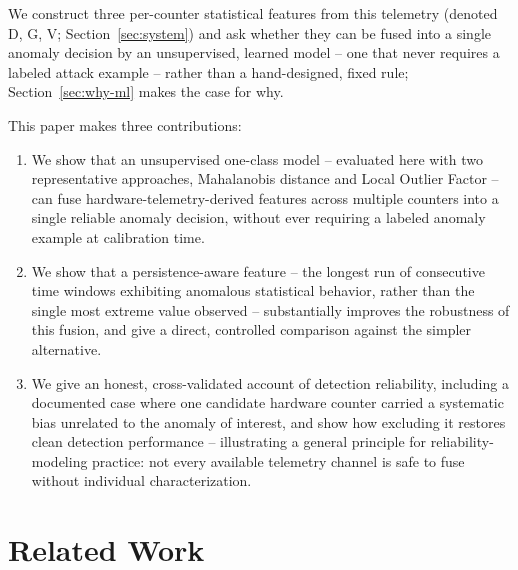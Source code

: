 \documentclass[conference]{IEEEtran}
\begin{document}
We construct three per-counter statistical features from this telemetry (denoted D, G, V; Section~\ref{sec:system}) and ask whether they can be fused into a single anomaly decision by an unsupervised, learned model -- one that never requires a labeled attack example -- rather than a hand-designed, fixed rule; Section~\ref{sec:why-ml} makes the case for why.

This paper makes three contributions:

\begin{enumerate}
\item We show that an unsupervised one-class model -- evaluated here with two representative approaches, Mahalanobis distance and Local Outlier Factor -- can fuse hardware-telemetry-derived features across multiple counters into a single reliable anomaly decision, without ever requiring a labeled anomaly example at calibration time.

\item We show that a persistence-aware feature -- the longest run of consecutive time windows exhibiting anomalous statistical behavior, rather than the single most extreme value observed -- substantially improves the robustness of this fusion, and give a direct, controlled comparison against the simpler alternative.

\item We give an honest, cross-validated account of detection reliability, including a documented case where one candidate hardware counter carried a systematic bias unrelated to the anomaly of interest, and show how excluding it restores clean detection performance -- illustrating a general principle for reliability-modeling practice: not every available telemetry channel is safe to fuse without individual characterization.
\end{enumerate}

\section{Related Work}
\end{document}
